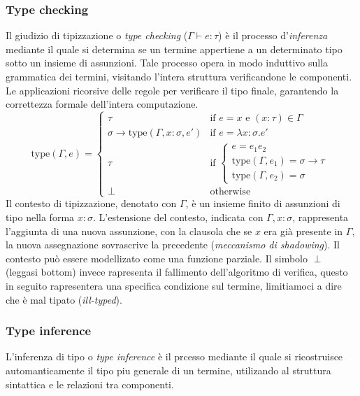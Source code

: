 \subsubsection{Type checking}
Il giudizio di tipizzazione o \emph{type checking} ($\Gamma \vdash e : \tau$) è il processo d'\emph{inferenza} mediante il quale si determina se un termine appertiene a un determinato tipo sotto un insieme di assunzioni.
Tale processo opera in modo induttivo sulla grammatica dei termini, visitando l'intera struttura verificandone le componenti. Le applicazioni ricorsive delle regole per verificare il tipo finale,
garantendo la correttezza formale dell'intera computazione.
\begin{equation}
    \text{type}(\Gamma, e) = 
    \begin{cases} 
        \tau & \text{if } e = x \text{ e } (x : \tau) \in \Gamma \\
        \sigma \to \text{type}(\Gamma, x:\sigma, e') & \text{if } e = \lambda x : \sigma . e' \\
        \tau & \text{if } 
            \begin{cases} 
            e = e_1 e_2 \\
            \text{type}(\Gamma, e_1) = \sigma \to \tau \\
            \text{type}(\Gamma, e_2) = \sigma 
            \end{cases} \\
        \perp & \text{otherwise}
    \end{cases}
    \label{eq:simple_typed_lambda_type_cheking_algorithm}
\end{equation}
Il contesto di tipizzazione, denotato con $\Gamma$, è un insieme finito di assunzioni di tipo nella forma $x : \sigma$.
L'estensione del contesto, indicata con $\Gamma, x : \sigma$, rappresenta l'aggiunta di una nuova assunzione, con la clausola 
che se $x$ era già presente in $\Gamma$, la nuova assegnazione sovrascrive la precedente (\emph{meccanismo di shadowing}). Il contesto
può essere modellizato come una funzione parziale. Il simbolo $\perp$ (leggasi bottom) invece rapresenta il fallimento dell'algoritmo
di verifica, questo in seguito rapresentera una specifica condizione sul termine, limitiamoci a dire che è mal tipato (\emph{ill-typed}).

\subsubsection{Type inference}
L'inferenza di tipo o \emph{type inference}  è il prcesso mediante il quale si ricostruisce automanticamente il tipo piu generale di un termine,
utilizando al struttura sintattica e le relazioni tra componenti.

